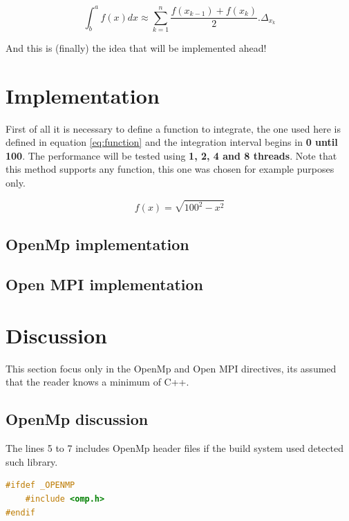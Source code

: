 	\begin{equation}
		\int^a_b{f(x) dx} \approx \sum_{k=1}^{n} \dfrac{f(x_{k-1})+f(x_k)}{2} . \Delta_{x_k}
		\label{eq:genericApproximation}
	\end{equation}

	\par And this is (finally) the idea that will be implemented ahead!
	
	\section{Implementation}
		\par First of all it is necessary to define a function to integrate, the one used here is defined in equation \ref{eq:function} and the integration interval begins in \textbf{0 until 100}. The performance will be tested using \textbf{1, 2, 4 and 8 threads}.  Note that this method supports any function, this one was chosen for example purposes only.\newline
		
		\begin{equation}
			f(x) = \sqrt{100^2 - x^2}
			\label{eq:function}
		\end{equation}	
	
		\subsection{OpenMp implementation}	
			
		
		\subsection{Open MPI implementation}	
			
			
	\section{Discussion}
		\par This section focus only in the OpenMp and Open MPI directives, its assumed that the reader knows a minimum of C++.\newline
		
		\subsection{OpenMp discussion}
		
		\par The lines 5 to 7 includes OpenMp header files if the build system used detected such library.
		\begin{lstlisting}[language=C++]
#ifdef _OPENMP
	#include <omp.h>
#endif
		\end{lstlisting}
	
